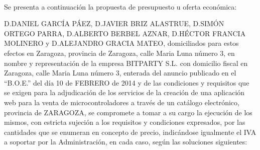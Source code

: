 \paragraph{}Se presenta a continuación la propuesta de presupuesto u oferta económica:

D.DANIEL GARCÍA PÁEZ, D.JAVIER BRIZ ALASTRUE, D.SIMÓN ORTEGO PARRA, D.ALBERTO BERBEL AZNAR, D.HÉCTOR FRANCIA MOLINERO y D.ALEJANDRO GRACIA MATEO, domiciliados para estos efectos en Zaragoza, provincia de Zaragoza, calle Maria Luna número 3, en nombre y representación de la empresa BITPARTY S.L. con domicilio fiscal en Zaragoza, calle Maria Luna número 3, enterada del anuncio publicado en el “B.O.E.” del día 10 de FEBRERO de 2014 y de las condiciones y requisitos que se exigen para la adjudicación de los servicios de la creación de una aplicación web para la venta de microcontroladores a través de un catálogo electrónico, provincia de ZARAGOZA, se compromete a tomar a su cargo la ejecución de los mismos, con estricta sujeción a los requisitos y condiciones expresados, por las cantidades que se enumeran en concepto de precio, indicándose igualmente el IVA a soportar por la Administración, en cada caso, según las soluciones siguientes:

